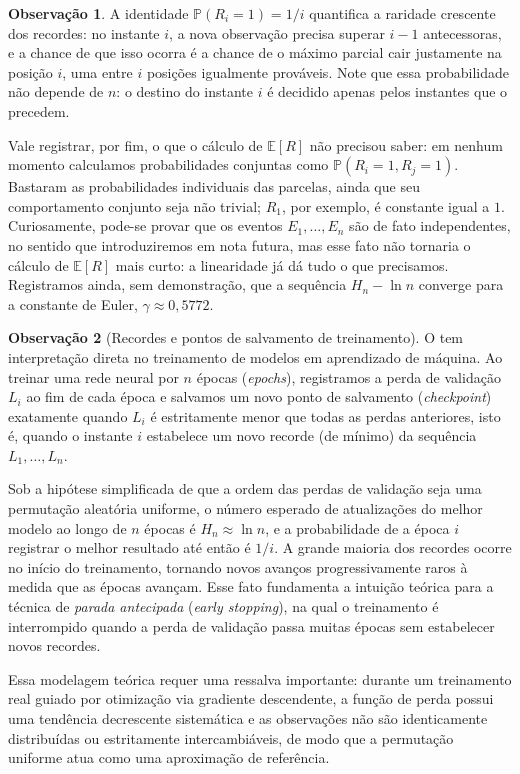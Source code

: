 \documentclass[12pt,portuguese]{article}
\theoremstyle{definition}
\newtheorem{remark}[remark]{Observação}
\begin{document}
\begin{remark}\label{rem:recordes-crescimento}
A identidade $\mathbb{P}(R_i=1)=1/i$ quantifica a raridade crescente dos
recordes: no instante $i$, a nova observação precisa superar $i-1$
antecessoras, e a chance de que isso ocorra é a chance de o máximo parcial
cair justamente na posição $i$, uma entre $i$ posições igualmente prováveis.
Note que essa probabilidade não depende de $n$: o destino do instante $i$ é
decidido apenas pelos instantes que o precedem.

Vale registrar, por fim, o que o cálculo de $\mathbb{E}[R]$ não precisou
saber: em nenhum momento calculamos probabilidades conjuntas como
$\mathbb{P}(R_i=1,R_j=1)$. Bastaram as probabilidades individuais das
parcelas, ainda que seu comportamento conjunto seja não trivial; $R_1$, por
exemplo, é constante igual a $1$. Curiosamente, pode-se provar que os eventos
$E_1,\ldots,E_n$ são de fato independentes, no sentido que introduziremos em
nota futura, mas esse fato não tornaria o cálculo de $\mathbb{E}[R]$ mais
curto: a linearidade já dá tudo o que precisamos. Registramos ainda, sem
demonstração, que a sequência $H_n-\ln n$ converge para a constante de
Euler, $\gamma\approx 0{,}5772$.
\end{remark}

\bigskip

\begin{remark}[Recordes e pontos de salvamento de treinamento]\label{rem:recordes-checkpoints}
O  tem interpretação direta no treinamento de
modelos em aprendizado de máquina. Ao treinar uma rede neural por $n$ épocas
(\emph{epochs}), registramos a perda de validação $L_i$ ao fim de cada época e
salvamos um novo ponto de salvamento (\emph{checkpoint}) exatamente quando $L_i$
é estritamente menor que todas as perdas anteriores, isto é, quando o instante
$i$ estabelece um novo recorde (de mínimo) da sequência $L_1,\ldots,L_n$.

Sob a hipótese simplificada de que a ordem das perdas de validação seja uma
permutação aleatória uniforme, o número esperado de atualizações do melhor
modelo ao longo de $n$ épocas é $H_n\approx\ln n$, e a probabilidade de a época
$i$ registrar o melhor resultado até então é $1/i$. A grande maioria dos
recordes ocorre no início do treinamento, tornando novos avanços
progressivamente raros à medida que as épocas avançam. Esse fato fundamenta a
intuição teórica para a técnica de \emph{parada antecipada} (\emph{early
stopping}), na qual o treinamento é interrompido quando a perda de validação
passa muitas épocas sem estabelecer novos recordes.

Essa modelagem teórica requer uma ressalva importante: durante um treinamento
real guiado por otimização via gradiente descendente, a função de perda possui
uma tendência decrescente sistemática e as observações não são identicamente
distribuídas ou estritamente intercambiáveis, de modo que a permutação uniforme
atua como uma aproximação de referência.
\end{remark}
\end{document}
